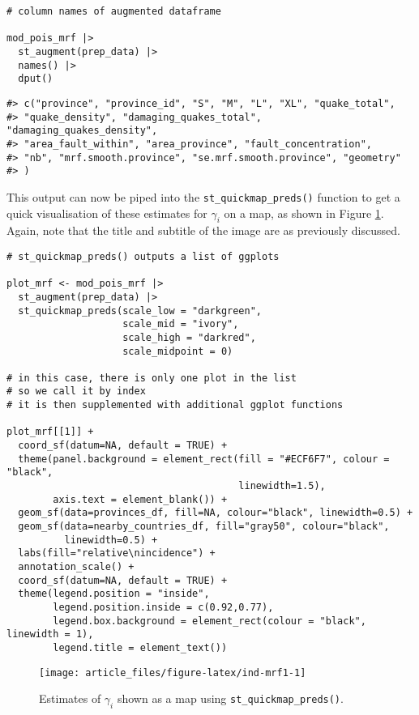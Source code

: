 \begin{verbatim}
# column names of augmented dataframe

mod_pois_mrf |>
  st_augment(prep_data) |>
  names() |>
  dput()
\end{verbatim}

\begin{verbatim}
#> c("province", "province_id", "S", "M", "L", "XL", "quake_total", 
#> "quake_density", "damaging_quakes_total", "damaging_quakes_density", 
#> "area_fault_within", "area_province", "fault_concentration", 
#> "nb", "mrf.smooth.province", "se.mrf.smooth.province", "geometry"
#> )
\end{verbatim}

This output can now be piped into the \texttt{st\_quickmap\_preds()} function to get a quick visualisation of
these estimates for \(\gamma_i\) on a map, as shown in Figure \ref{fig:ind-mrf1}. Again, note that the title and subtitle of the image are as previously discussed.



\begin{verbatim}
# st_quickmap_preds() outputs a list of ggplots

plot_mrf <- mod_pois_mrf |> 
  st_augment(prep_data) |>
  st_quickmap_preds(scale_low = "darkgreen",
                    scale_mid = "ivory", 
                    scale_high = "darkred", 
                    scale_midpoint = 0)

# in this case, there is only one plot in the list
# so we call it by index
# it is then supplemented with additional ggplot functions

plot_mrf[[1]] +
  coord_sf(datum=NA, default = TRUE) +
  theme(panel.background = element_rect(fill = "#ECF6F7", colour = "black", 
                                        linewidth=1.5),
        axis.text = element_blank()) +
  geom_sf(data=provinces_df, fill=NA, colour="black", linewidth=0.5) + 
  geom_sf(data=nearby_countries_df, fill="gray50", colour="black", 
          linewidth=0.5) + 
  labs(fill="relative\nincidence") +
  annotation_scale() +
  coord_sf(datum=NA, default = TRUE) +
  theme(legend.position = "inside",
        legend.position.inside = c(0.92,0.77),
        legend.box.background = element_rect(colour = "black", linewidth = 1),
        legend.title = element_text())
\end{verbatim}

\begin{figure}

{\centering \texttt{[image: article\_files/figure-latex/ind-mrf1-1]} 

}

\caption{Estimates of \(\gamma_i\) shown as a map using \texttt{st\_quickmap\_preds()}.}\label{fig:ind-mrf1}
\end{figure}

